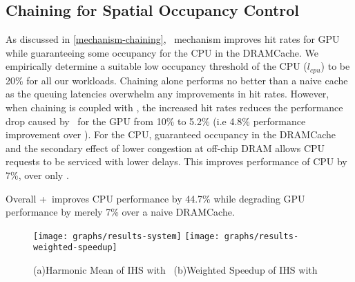 
\subsection{Chaining for Spatial Occupancy Control}
As discussed in \ref{mechanism-chaining}, \chaining\ mechanism improves hit rates for GPU while guaranteeing some occupancy for the CPU in the DRAMCache. We empirically determine a suitable low occupancy threshold of the CPU (\textit{$l_{cpu}$}) to be 20\% for all our workloads. Chaining alone performs no better than a naive cache as the queuing latencies overwhelm any improvements in hit rates. However, when chaining is coupled with \prioname, the increased hit rates reduces the performance drop caused by \prioname\ for the GPU from 10\% to 5.2\% (i.e 4.8\% performance improvement over \prioname). For the CPU, guaranteed occupancy in the DRAMCache and the secondary effect of lower congestion at off-chip DRAM allows CPU requests to be serviced with lower delays. This improves performance of CPU by 7\%, over only \prioname.
\par Overall \chaining+\prioname\ improves CPU performance by 44.7\% while degrading GPU performance by merely 7\% over a naive DRAMCache.
\\
\begin{figure}[!htb]
    \centering
    \texttt{[image: graphs/results-system]}
    \texttt{[image: graphs/results-weighted-speedup]}
    \caption{(a)Harmonic Mean of IHS with \cachename\ (b)Weighted Speedup of IHS with \cachename}
    \label{results-system}
\end{figure}


